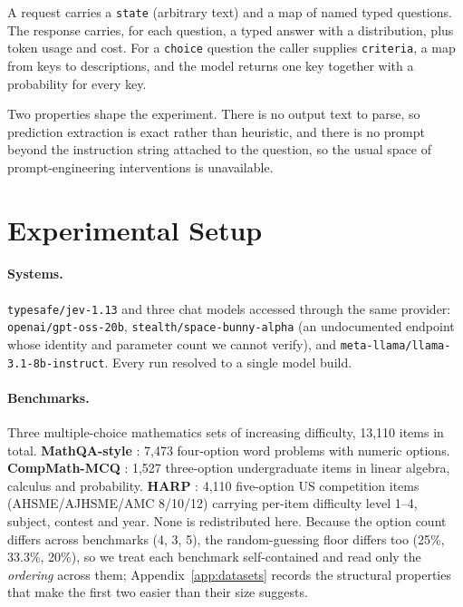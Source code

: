 \documentclass[11pt]{article}
\begin{document}
A request carries a \texttt{state} (arbitrary text) and a map of named typed questions. The response carries, for each question, a typed answer with a distribution, plus token usage and cost. For a \texttt{choice} question the caller supplies \texttt{criteria}, a map from keys to descriptions, and the model returns one key together with a probability for every key.

Two properties shape the experiment. There is no output text to parse, so prediction extraction is exact rather than heuristic, and there is no prompt beyond the instruction string attached to the question, so the usual space of prompt-engineering interventions is unavailable.

\section{Experimental Setup}
\label{sec:setup}

\paragraph{Systems.}
\texttt{typesafe/jev-1.13} and three chat models accessed through the same provider: \texttt{openai/gpt-oss-20b}, \texttt{stealth/space-bunny-alpha} (an undocumented endpoint whose identity and parameter count we cannot verify), and \texttt{meta-llama/llama-3.1-8b-instruct}. Every run resolved to a single model build.

\paragraph{Benchmarks.}
Three multiple-choice mathematics sets of increasing difficulty, 13,110 items in total. \textbf{MathQA-style} \citep{nlp2025math}: 7,473 four-option word problems with numeric options. \textbf{CompMath-MCQ} \citep{raimondi2026compmath}: 1,527 three-option undergraduate items in linear algebra, calculus and probability. \textbf{HARP} \citep{yue2024harp}: 4,110 five-option US competition items (AHSME/AJHSME/AMC 8/10/12) carrying per-item difficulty level 1--4, subject, contest and year. None is redistributed here. Because the option count differs across benchmarks (4, 3, 5), the random-guessing floor differs too (25\%, 33.3\%, 20\%), so we treat each benchmark self-contained and read only the \emph{ordering} across them; Appendix~\ref{app:datasets} records the structural properties that make the first two easier than their size suggests.
\end{document}
